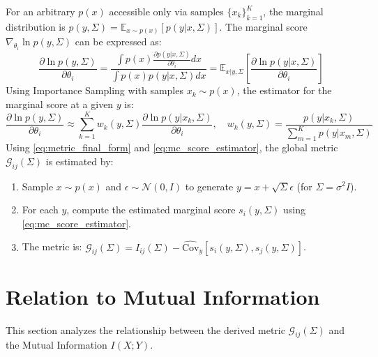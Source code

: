 \documentclass{article}
\begin{document}
For an arbitrary $p(x)$ accessible only via samples $\{x_k\}_{k=1}^K$, the marginal distribution is $p(y, \Sigma) = \mathbb{E}_{x \sim p(x)} [p(y|x, \Sigma)]$.
The marginal score $\nabla_{\theta_i} \ln p(y, \Sigma)$ can be expressed as:
\begin{equation} \label{eq:mc_score_ratio}
    \frac{\partial \ln p(y, \Sigma)}{\partial \theta_i} = \frac{\int p(x) \frac{\partial p(y|x, \Sigma)}{\partial \theta_i} dx}{\int p(x) p(y|x, \Sigma) dx} = \mathbb{E}_{x|y, \Sigma} \left[ \frac{\partial \ln p(y|x, \Sigma)}{\partial \theta_i} \right]
\end{equation}
Using Importance Sampling with samples $x_k \sim p(x)$, the estimator for the marginal score at a given $y$ is:
\begin{equation} \label{eq:mc_score_estimator}
    \frac{\partial \ln p(y, \Sigma)}{\partial \theta_i} \approx \sum_{k=1}^K w_k(y, \Sigma) \frac{\partial \ln p(y|x_k, \Sigma)}{\partial \theta_i}, \quad w_k(y, \Sigma) = \frac{p(y|x_k, \Sigma)}{\sum_{m=1}^K p(y|x_m, \Sigma)}
\end{equation}
Using \eqref{eq:metric_final_form} and \eqref{eq:mc_score_estimator}, the global metric $\mathcal{G}_{ij}(\Sigma)$ is estimated by:
\begin{enumerate}
    \item Sample $x \sim p(x)$ and $\epsilon \sim \mathcal{N}(0, I)$ to generate $y = x + \sqrt{\Sigma}\epsilon$ (for $\Sigma = \sigma^2 I$).
    \item For each $y$, compute the estimated marginal score $s_i(y, \Sigma)$ using \eqref{eq:mc_score_estimator}.
    \item The metric is: $\mathcal{G}_{ij}(\Sigma) = I_{ij}(\Sigma) - \widehat{\mathrm{Cov}}_y [ s_i(y, \Sigma), s_j(y, \Sigma) ]$.
\end{enumerate}

\section{Relation to Mutual Information}
This section analyzes the relationship between the derived metric $\mathcal{G}_{ij}(\Sigma)$ and the Mutual Information $I(X; Y)$.
\end{document}

